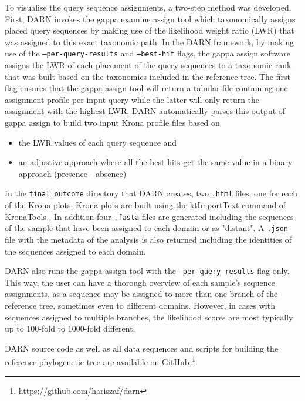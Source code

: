    To visualise the query sequence assignments, a two-step method was developed. 
   First, DARN invokes the gappa examine assign tool which taxonomically assigns placed query sequences by making use of the likelihood weight ratio (LWR) that was assigned to this exact taxonomic path. 
   In the DARN framework, by making use of the \texttt{--per-query-results} and \texttt{--best-hit} flags, the gappa assign software assigns the LWR of each placement of the query sequences to a taxonomic rank that was built based on the taxonomies included in the reference tree. 
   The first flag ensures that the gappa assign tool will return a tabular file containing one assignment profile per input query while the latter will only return the assignment with the highest LWR. 
   DARN automatically parses this output of gappa assign to build two input Krona profile files based on 

   \begin{itemize}
      \item the LWR values of each query sequence and
      \item an adjustive approach where all the best hits get the same value in a binary approach (presence - absence)
   \end{itemize}
   
   In the \texttt{final\_outcome} directory that DARN creates, two \texttt{.html} files, one for each of the Krona plots; 
   Krona plots are built using the ktImportText command of KronaTools \citep{ondov2011interactive}. 
   In addition four \texttt{.fasta} files are generated including the sequences of the sample that have been assigned to each domain or as "distant". 
   A \texttt{.json} file with the metadata of the analysis is also returned including the identities of the sequences assigned to each domain.

   DARN also runs the gappa assign tool with the \texttt{--per-query-results} flag only. 
   This way, the user can have a thorough overview of each sample’s sequence assignments, as a sequence may be assigned to more than one branch of the reference tree, sometimes even to different domains. 
   However, in cases with sequences assigned to multiple branches, the likelihood scores are most typically up to 100-fold to 1000-fold different.

   DARN source code as well as all data sequences and scripts for building the reference phylogenetic tree are available on \href{https://github.com/hariszaf/darn}{GitHub} \footnote{
      \href{https://github.com/hariszaf/darn}{https://github.com/hariszaf/darn}
   }.



